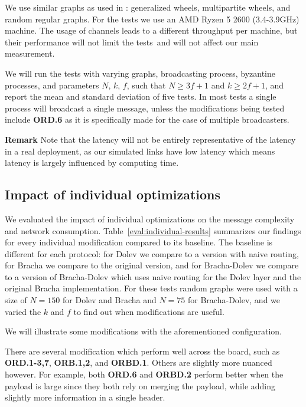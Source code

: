 We use similar graphs as used in \cite{bonomi2021practical,bonomi2019multihop}: generalized wheels, multipartite wheels, and random regular graphs. For the tests we use an AMD Ryzen 5 2600 (3.4-3.9GHz) machine. The usage of channels leads to a different throughput per machine, but their performance will not limit the tests~\citationneeded and will not affect our main measurement.

We will run the tests with varying graphs, broadcasting process, byzantine processes, and parameters $N$, $k$, $f$, such that $N \ge 3f+1$ and $k \ge 2f+1$, and report the mean and standard deviation of five tests. In most tests a single process will broadcast a single message, unless the modifications being tested include \textbf{ORD.6} as it is specifically made for the case of multiple broadcasters.

\textbf{Remark}
Note that the latency will not be entirely representative of the latency in a real deployment, as our simulated links have low latency which means latency is largely influenced by computing time. 

\subsection{Impact of individual optimizations}
We evaluated the impact of individual optimizations on the message complexity and network consumption. Table~\ref{eval:individual-results} summarizes our findings for every individual modification compared to its baseline. The baseline is different for each protocol: for Dolev we compare to a version with naive routing, for Bracha we compare to the original version, and for Bracha-Dolev we compare to a version of Bracha-Dolev which uses naive routing for the Dolev layer and the original Bracha implementation. For these tests random graphs were used with a size of $N=150$ for Dolev and Bracha and $N=75$ for Bracha-Dolev, and we varied the $k$ and $f$ to find out when modifications are useful. 

We will illustrate some modifications with the aforementioned configuration.

There are several modification which perform well across the board, such as \textbf{ORD.1-3,7}, \textbf{ORB.1,2}, and \textbf{ORBD.1}. Others are slightly more nuanced however. For example, both \textbf{ORD.6} and \textbf{ORBD.2} perform better when the payload is large since they both rely on merging the payload, while adding slightly more information in a single header. 

